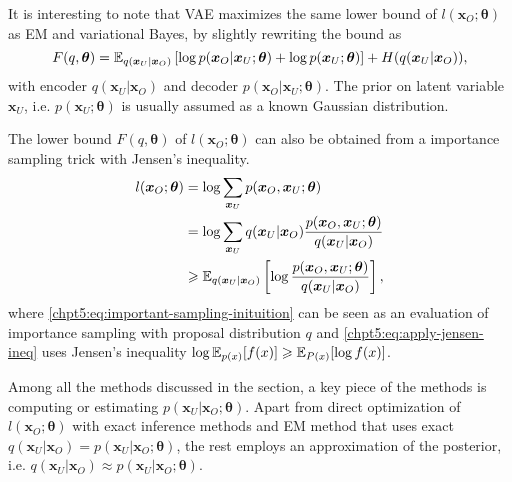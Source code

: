 It is interesting to note that VAE maximizes the same lower bound of $l(\bm{x}_O;\bm{\theta})$ as EM and variational Bayes, by slightly rewriting the bound as
\begin{equation}
  F(q, \bm{\theta}) = \mathbb{E}_{q(\bm{x}_U|\bm{x}_O)}\left[ \log{{p}(\bm{x}_O| \bm{x}_U; \bm{\theta})} + \log{{p}(\bm{x}_U; \bm{\theta})} \right] + H({q(\bm{x}_U|\bm{x}_O)}),
\end{equation}
with encoder $q(\bm{x}_U|\bm{x}_O)$ and decoder ${p}(\bm{x}_O| \bm{x}_U; \bm{\theta})$. The prior on latent variable $\bm{x}_U$, i.e. ${p}(\bm{x}_U; \bm{\theta})$ is usually assumed as a known Gaussian distribution.


\begin{remark}
  The lower bound $F(q, \bm{\theta})$ of $l(\bm{x}_O; \bm{\theta})$ can also be obtained from a importance sampling trick with Jensen's inequality.
  \begin{align}
    l(\bm{x}_O; \bm{\theta}) & = \log{\sum_{\bm{x}_U} {p}(\bm{x}_O, \bm{x}_U; \bm{\theta})} \nonumber \\
                             & = \log{\sum_{\bm{x}_U} {q(\bm{x}_U|\bm{x}_O)}\frac{{p}(\bm{x}_O, \bm{x}_U; \bm{\theta})}{q(\bm{x}_U|\bm{x}_O)} } \label{chpt5:eq:important-sampling-inituition}\\
                             & \geqslant \mathbb{E}_{q(\bm{x}_U|\bm{x}_O)}\left[ \log{\frac{{p}(\bm{x}_O, \bm{x}_U; \bm{\theta})}{q(\bm{x}_U|\bm{x}_O)}}\right] \label{chpt5:eq:apply-jensen-ineq},
  \end{align}
  where \eqref{chpt5:eq:important-sampling-inituition} can be seen as an evaluation of importance sampling with proposal distribution $q$ and \eqref{chpt5:eq:apply-jensen-ineq} uses Jensen's inequality $\log{\mathbb{E}_{p(x)}[f(x)] \geqslant\mathbb{E}_{P(x)}[\log{f(x)}]}$.
\end{remark}

\begin{remark}
  Among all the methods discussed in the section, a key piece of the methods is computing or estimating $p(\bm{x}_U| \bm{x}_O; \bm{\theta})$. Apart from direct optimization of $l(\bm{x}_O;\bm{\theta})$ with exact inference methods and EM method that uses exact $q(\bm{x}_U| \bm{x}_O) = p(\bm{x}_U| \bm{x}_O; \bm{\theta})$, the rest employs an approximation of the posterior, i.e. $q(\bm{x}_U| \bm{x}_O) \approx p(\bm{x}_U| \bm{x}_O; \bm{\theta})$.
\end{remark}

